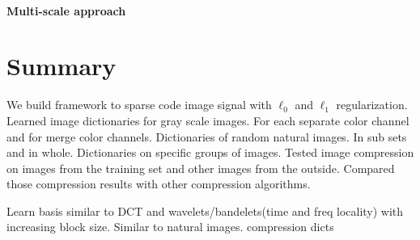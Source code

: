 \paragraph{Multi-scale approach}




\section{Summary} 
We build framework to sparse code image signal with $\ell_0$ and
$\ell_1$ regularization. Learned image dictionaries for gray scale images. For
each separate color channel and for merge color channels. Dictionaries of
random natural images. In sub sets and in whole. Dictionaries on specific
groups of images. 
Tested image compression on images from the training set and other images from
the outside. Compared those compression results with other compression
algorithms.


Learn basis similar to DCT and wavelets/bandelets(time and freq locality) with
increasing block size.
Similar to natural images.
compression dicts
